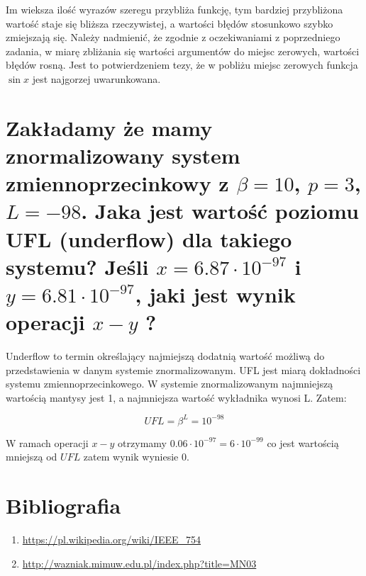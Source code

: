 \documentclass[5]{article}
\begin{document}
Im wieksza ilość wyrazów szeregu przybliża funkcję, tym bardziej przybliżona wartość staje się bliższa rzeczywistej, a wartości błędów stosunkowo szybko zmiejszają się. Należy nadmienić, że zgodnie z oczekiwaniami z poprzedniego zadania, w miarę zbliżania się wartości argumentów do miejsc zerowych, wartości błędów rosną. Jest to potwierdzeniem tezy, że w pobliżu miejsc zerowych funkcja $\sin x$ jest najgorzej uwarunkowana.

\section{Zakładamy że mamy znormalizowany system zmiennoprzecinkowy z $\beta = 10$, $p = 3$, $L = -98$. Jaka jest wartość poziomu UFL (underflow) dla takiego systemu? Jeśli $x=6.87\cdot 10^{-97}$ i $y = 6.81\cdot10^{-97}$, jaki jest wynik operacji $x-y$ ?}

Underflow to termin określający najmiejszą dodatnią wartość możliwą do przedstawienia w danym systemie znormalizowanym. UFL jest miarą dokładności systemu zmiennoprzecinkowego. W systemie znormalizowanym najmniejszą wartością mantysy jest 1, a najmniejsza wartość wykładnika wynosi L. Zatem:

\[UFL = \beta ^{L} = 10^{-98}\]

W ramach operacji $x-y$ otrzymamy $0.06\cdot10^{-97}=6\cdot10^{-99}$ co jest wartością mniejszą od $UFL$ zatem wynik wyniesie 0.

\section{Bibliografia}

\begin{enumerate}
  \item \url{https://pl.wikipedia.org/wiki/IEEE_754}
  \item \url{http://wazniak.mimuw.edu.pl/index.php?title=MN03}
\end{enumerate}
\end{document}
